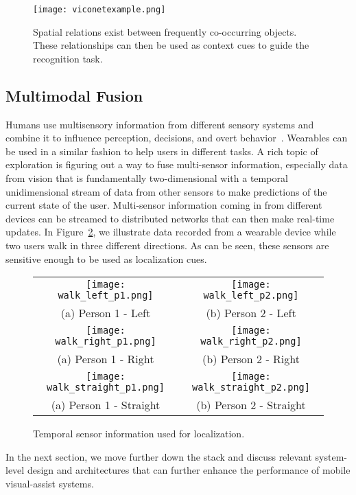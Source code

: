 \begin{figure}[!htb]
\centering
\texttt{[image: viconetexample.png]}
\caption{Spatial relations exist between frequently co-occurring objects. These relationships can then be used as context cues to guide the recognition task.}
\label{fig:viconet}
\end{figure} 

\subsection{Multimodal Fusion}
Humans use multisensory information from different sensory systems and combine it to influence 
perception, decisions, and overt behavior~\cite{stein2009neural}. Wearables can be used in a similar fashion to help users in different tasks. 
A rich topic of exploration is figuring out a way to fuse multi-sensor information, especially data from vision that is fundamentally two-dimensional with a temporal 
unidimensional stream of data from other sensors to make predictions of the current state of the user. Multi-sensor information coming in from different devices can be 
streamed to distributed networks that can then make real-time updates. In Figure~\ref{tab:sensor}, we illustrate data recorded from a wearable device while two users
walk in three different directions. As can be seen, these sensors are sensitive enough to be used as localization cues. 

\begin{figure}[!htb]
\centering
\begin{tabular}{@{}c@{} @{}c@{}}
\vspace{-5pt}
\texttt{[image: walk\_left\_p1.png]} & \texttt{[image: walk\_left\_p2.png]}\\[\abovecaptionskip]
\small(a) Person 1 - Left & \small (b) Person 2 - Left\\
\texttt{[image: walk\_right\_p1.png]} & \texttt{[image: walk\_right\_p2.png]}\\[\abovecaptionskip]
\small(a) Person 1 - Right & \small (b) Person 2 - Right\\
\texttt{[image: walk\_straight\_p1.png]} & \texttt{[image: walk\_straight\_p2.png]}\\[\abovecaptionskip]
\small(a) Person 1 - Straight & \small (b) Person 2 - Straight\\
\end{tabular}
\caption{Temporal sensor information used for localization.}
\label{tab:sensor}
\end{figure}

In the next section, we move further down the stack and discuss relevant system-level design and architectures that can further enhance the performance of mobile 
visual-assist systems. 
